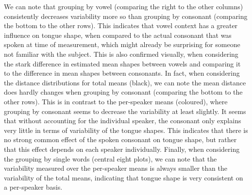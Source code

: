 We can note that grouping by vowel (comparing the right to the other columns) consistently decreases variability more so than grouping by consonant (comparing the bottom to the other rows). 
This indicates that vowel context has a greater influence on tongue shape, when compared to the actual  consonant that was spoken at time of measurement, which might already be surprising for someone not familiar with the subject.
This is also confirmed visually, when considering the stark difference in estimated mean shapes between vowels and comparing it to the difference in mean shapes between consonants.
In fact, when considering the distance distributions for total means (black), we can note the mean distance does hardly changes when grouping by consonant (comparing the bottom to the other rows).
This is in contrast to the per-speaker means (coloured), where grouping by consonant seems to decrease the variability at least slightly.
It seems that without accounting for the individual speaker, the consonant only explains very little in terms of variability of the tongue shapes.
This indicates that there is no strong common effect of the spoken consonant on tongue shape, but rather that this effect depends on each speaker individually.
Finally, when considering the grouping by single words (central eight plots), we can note that the variability measured over the per-speaker means is always smaller than the variability of the total means, indicating that tongue shape is very consistent on a per-speaker basis.

